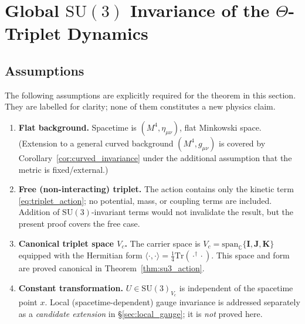 %
%


\section{Global $\mathrm{SU}(3)$ Invariance of the $\Theta$-Triplet Dynamics}
\label{sec:global_invariance}

\subsection{Assumptions}
\label{subsec:global_assumptions}

The following assumptions are explicitly required for the theorem in this section.
They are labelled for clarity; none of them constitutes a new physics claim.

\begin{enumerate}[label=\textbf{A\arabic*.}]
  \item \textbf{Flat background.} Spacetime is $(M^4, \eta_{\mu\nu})$, flat
    Minkowski space.  (Extension to a general curved background
    $(M^4, g_{\mu\nu})$ is covered by Corollary~\ref{cor:curved_invariance}
    under the additional assumption that the metric is fixed/external.)
  \item \textbf{Free (non-interacting) triplet.} The action contains only the
    kinetic term \eqref{eq:triplet_action}; no potential, mass, or coupling
    terms are included.  Addition of $\mathrm{SU}(3)$-invariant terms would
    not invalidate the result, but the present proof covers the free case.
  \item \textbf{Canonical triplet space $V_c$.}  The carrier space is
    $V_c = \mathrm{span}_\mathbb{C}\{\mathbf{I},\mathbf{J},\mathbf{K}\}$
    equipped with the Hermitian form $\langle\cdot,\cdot\rangle =
    \tfrac{1}{4}\mathrm{Tr}(\cdot^\dagger\cdot)$.  This space and form are
    proved canonical in Theorem~\ref{thm:su3_action}.
  \item \textbf{Constant transformation.} $U\in\mathrm{SU}(3)_{V_c}$ is
    independent of the spacetime point $x$.  Local (spacetime-dependent)
    gauge invariance is addressed separately as a \emph{candidate extension}
    in \S\ref{sec:local_gauge}; it is \emph{not} proved here.
\end{enumerate}

